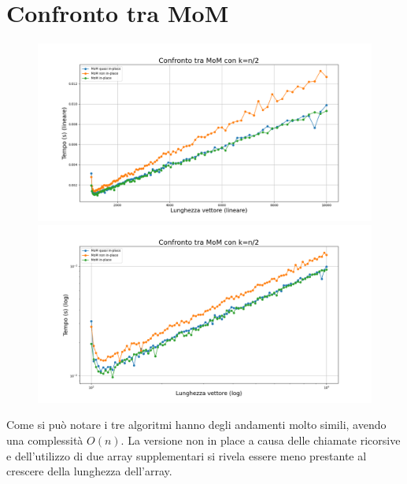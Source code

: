 \documentclass[a4paper]{article}
\begin{document}
\newpage

\section{Confronto tra MoM}
\label{sec:confronto-mom}
\begin{figure}[h]
    \centering
    \includegraphics[width=.83\textwidth]{graphs/MoMs_n.png}
    \includegraphics[width=.83\textwidth]{graphs/MoMs_2xlog.png}
\end{figure}
Come si può notare i tre algoritmi hanno degli andamenti molto simili, avendo una complessità $O(n)$. La versione non in place a causa delle chiamate ricorsive e dell'utilizzo di due array supplementari si rivela essere meno prestante al crescere della lunghezza dell'array.\\
\end{document}
